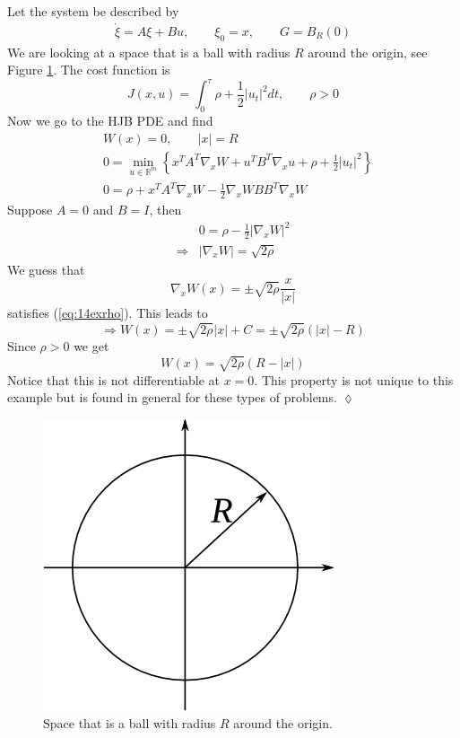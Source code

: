 \begin{example}
Let the system be described by
\begin{align*}
\dot{\xi} = A\xi+Bu, \qquad \xi_0 = x, \qquad G=B_R(0)
\end{align*}
We are looking at a space that is a ball with radius $R$ around the origin, see Figure \ref{fig:14circle}. The cost function is
$$J(x,u) = \int_0^\tau \rho + \frac{1}{2}|u_t|^2dt, \qquad \rho>0$$
Now we go to the HJB PDE and find
\begin{align*}
&W(x) = 0, \qquad |x|=R \\
&0 = \min_{u\in\mathbb{R}^m} \left\lbrace x^TA^T\nabla_xW + u^TB^T\nabla_xu + \rho + \frac{1}{2}|u_t|^2 \right\rbrace \\
&0 = \rho + x^TA^T\nabla_xW - \frac{1}{2}\nabla_xWBB^T\nabla_xW
\end{align*}
Suppose $A=0$ and $B=I$, then
\begin{align}
\label{eq:14exrho}
&0 = \rho - \frac{1}{2}|\nabla_xW|^2 \nonumber \\
\Rightarrow &|\nabla_xW| = \sqrt{2\rho}
\end{align}
We guess that
$$\nabla_xW(x) = \pm \sqrt{2\rho}\frac{x}{|x|}$$
satisfies (\ref{eq:14exrho}). This leads to
$$\Rightarrow W(x) = \pm\sqrt{2\rho}|x|+C = \pm\sqrt{2\rho}(|x|-R)$$
Since $\rho>0$ we get
$$W(x) = \sqrt{2\rho}(R-|x|)$$
Notice that this is not differentiable at $x=0$. This property is not unique to this example but is found in general for these types of problems.
$\lozenge$
\end{example}

\begin{figure}[ht!]
	\centering
	\includegraphics[width=.4\textwidth]{images/14circle}
	\caption{Space that is a ball with radius $R$ around the origin.}
	\label{fig:14circle}
\end{figure}


